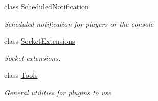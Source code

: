 \begin{DoxyCompactItemize}
class \hyperlink{classOTA_1_1ScheduledNotification}{Scheduled\+Notification}
\begin{DoxyCompactList}\small\item\em Scheduled notification for players or the console \end{DoxyCompactList}\item 
class \hyperlink{classOTA_1_1SocketExtensions}{Socket\+Extensions}
\begin{DoxyCompactList}\small\item\em Socket extensions. \end{DoxyCompactList}\item 
class \hyperlink{classOTA_1_1Tools}{Tools}
\begin{DoxyCompactList}\small\item\em General utilities for plugins to use \end{DoxyCompactList}\end{DoxyCompactItemize}
